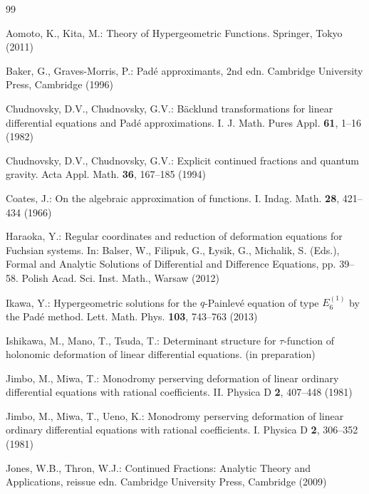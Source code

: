 \documentclass[12pt]{article}
\numberwithin{equation}{section}
\begin{document}
\small
\begin{thebibliography}{99}


Aomoto, K.,  Kita, M.:  
Theory of Hypergeometric Functions.
Springer, Tokyo (2011)

Baker, G.,  
Graves-Morris, P.:
Pad\'e approximants, 2nd edn.
Cambridge University Press, Cambridge (1996)

Chudnovsky, D.V., 
Chudnovsky,  G.V.:
B\"acklund transformations for linear differential equations and Pad\'e approximations. I.
J. Math. Pures Appl. {\bf 61},
1--16 
(1982)

Chudnovsky, D.V., 
Chudnovsky,  G.V.: 
Explicit continued fractions and quantum gravity.
Acta Appl. Math. {\bf 36},
167--185 (1994) 


Coates,  J.:
On the algebraic approximation of functions. I.
Indag. Math. {\bf 28},
421--434 (1966)
  
Haraoka, Y.: 
Regular coordinates and reduction of deformation equations for Fuchsian systems. 
In:
Balser, W.,
Filipuk, G.,
\L ysik, G.,
Michalik, S.
(Eds.),
Formal and Analytic Solutions of Differential and Difference Equations, 
pp. 39--58.
Polish Acad. Sci. Inst. Math., 
Warsaw (2012)

 
 
Ikawa, Y.:
Hypergeometric solutions for the $q$-Painlev\'e  equation of type $E^{(1)}_6$ 
by the Pad\'e method.
Lett. Math. Phys. {\bf 103},
743--763
 (2013)


Ishikawa, M.,
Mano, T.,  
Tsuda,  T.:
Determinant structure for $\tau$-function of holonomic deformation of linear differential equations.
(in preparation)

Jimbo, M.,  Miwa, T.:
Monodromy perserving deformation of linear ordinary differential equations with rational coefficients. II.
Physica D
{\bf 2},  
407--448 (1981)


Jimbo, M.,
Miwa,  T.,
Ueno, K.:
Monodromy perserving deformation of linear ordinary differential equations with rational coefficients. I.
Physica D
{\bf 2},  306--352 (1981)


Jones, W.B., 
Thron, W.J.:
Continued Fractions: Analytic Theory and Applications, 
reissue edn.
Cambridge University Press, Cambridge (2009)




\end{thebibliography}
\end{document}
